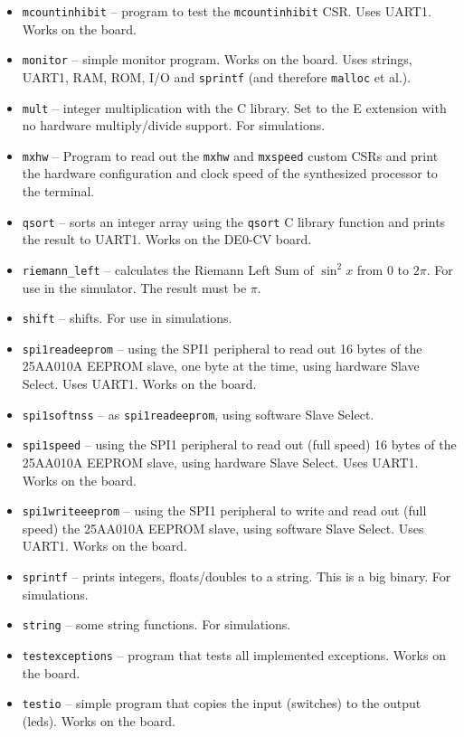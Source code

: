\documentclass[12pt]{article}
\begin{document}
\begin{itemize}
\item \lstinline|mcountinhibit| -- program to test the \lstinline|mcountinhibit| CSR. Uses UART1. Works on the board.
\item \lstinline|monitor| -- simple monitor program. Works on the board. Uses strings, UART1, RAM, ROM, I/O and \lstinline|sprintf| (and therefore \lstinline|malloc| et al.).
\item \lstinline|mult| -- integer multiplication with the C library. Set to the E extension with no hardware multiply/divide support. For simulations.
\item \lstinline|mxhw| -- Program to read out the \lstinline|mxhw| and \lstinline|mxspeed| custom CSRs and print the hardware configuration and clock speed of the synthesized processor to the terminal.
\item \lstinline|qsort| -- sorts an integer array using the \lstinline|qsort| C library function and prints the result to UART1. Works on the DE0-CV board.
\item \lstinline|riemann_left| -- calculates the Riemann Left Sum of $\sin^2 x$ from $0$ to $2\pi$. For use in the simulator. The  result must be $\pi$.
\item \lstinline|shift| -- shifts. For use in simulations.
\item \lstinline|spi1readeeprom| -- using the SPI1 peripheral to read out 16 bytes of the 25AA010A EEPROM slave, one byte at the time, using hardware Slave Select. Uses UART1. Works on the board.
\item \lstinline|spi1softnss| -- as \lstinline|spi1readeeprom|, using software Slave Select.
\item \lstinline|spi1speed| -- using the SPI1 peripheral to read out (full speed) 16 bytes of the 25AA010A EEPROM slave, using hardware Slave Select. Uses UART1. Works on the board.
\item \lstinline|spi1writeeeprom| -- using the SPI1 peripheral to write and read out (full speed) the 25AA010A EEPROM slave, using software Slave Select. Uses UART1. Works on the board.
\item \lstinline|sprintf| -- prints integers, floats/doubles to a string. This is a big binary. For simulations.
\item \lstinline|string| -- some string functions. For simulations.
\item \lstinline|testexceptions| -- program that tests all implemented exceptions. Works on the board.
\item \lstinline|testio| -- simple program that copies the input (switches) to the output (leds). Works on the board.

\end{itemize}
\end{document}
